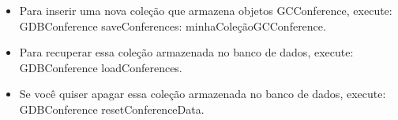 \begin{itemize}
\item Para inserir uma nova coleção que armazena objetos GCConference, execute:\\
{GDBConference saveConferences: minhaColeçãoGCConference.}
\item Para recuperar essa coleção armazenada no banco de dados, execute:\\
{GDBConference loadConferences.}
\item Se você quiser apagar essa coleção armazenada no banco de dados, execute:\\
{GDBConference resetConferenceData.}
\end{itemize}
